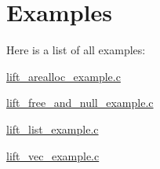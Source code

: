 \section{Examples}
Here is a list of all examples\-:\begin{DoxyCompactItemize}
\item 
\hyperlink{lift_arealloc_example_8c-example}{lift\-\_\-arealloc\-\_\-example.\-c}
\item 
\hyperlink{lift_free_and_null_example_8c-example}{lift\-\_\-free\-\_\-and\-\_\-null\-\_\-example.\-c}
\item 
\hyperlink{lift_list_example_8c-example}{lift\-\_\-list\-\_\-example.\-c}
\item 
\hyperlink{lift_vec_example_8c-example}{lift\-\_\-vec\-\_\-example.\-c}
\end{DoxyCompactItemize}
